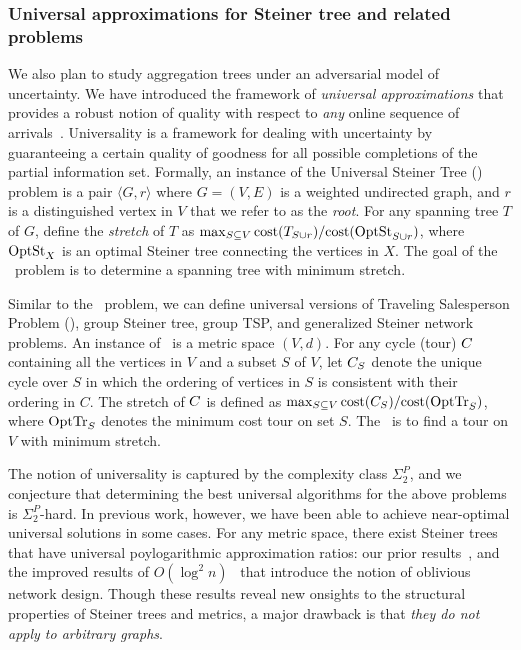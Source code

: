 \subsubsection{Universal approximations for Steiner tree and related problems}
\label{sec:ust}
We also plan to study aggregation trees under an adversarial model of
uncertainty.  We have introduced the framework of {\em universal
  approximations}\/ that provides a robust notion of quality with
respect to {\em any} online sequence of
arrivals~\cite{jia+lnrs:universal}.  Universality is a framework for
dealing with uncertainty by guaranteeing a certain quality of goodness
for all possible completions of the partial information set.
Formally, an instance of the Universal Steiner Tree (\ust) problem is
a pair $\langle G , r\rangle$ where $G = (V,E)$ is a weighted
undirected graph, and $r$ is a distinguished vertex in $V$ that we
refer to as the {\em root}.  For any spanning tree $T$ of $G$, define
the {\em stretch}\/ of $T$ as $\max_{S \subseteq V}\mbox{cost}(T_{S\cup
    r})/\mbox{cost}(\mbox{OptSt}_{S\cup r})$, where $\mbox{OptSt}_{X}$ is an optimal
Steiner tree connecting the vertices in $X$.  The goal of the
\ust\ problem is to determine a spanning tree with minimum stretch.

Similar to the \ust\ problem, we can define universal versions of
Traveling Salesperson Problem (\utsp), group Steiner tree, group TSP,
and generalized Steiner network problems.  An instance of \utsp\ is a
metric space $(V,d)$.  For any cycle (tour) $C$ containing all the
vertices in $V$ and a subset $S$ of $V$, let $C_S$ denote the unique
cycle over $S$ in which the ordering of vertices in $S$ is consistent
with their ordering in $C$.  The stretch of $C$ is defined as
$\max_{S\subseteq V} \mbox{cost}(C_{S})/\mbox{cost}(\mbox{OptTr}_{S})$, where $\mbox{OptTr}_{S}$
denotes the minimum cost tour on set $S$. The \utsp\ is to find a tour
on $V$ with minimum stretch.


The notion of universality is captured by the complexity class
$\Sigma_2^P$, and we conjecture that determining the best universal
algorithms for the above problems is $\Sigma^P_2$-hard.  In previous
work, however, we have been able to achieve near-optimal universal
solutions in some cases.  For any metric space, there exist Steiner
trees that have universal poylogarithmic approximation ratios: our
prior results~\cite{jia+lnrs:universal}, and the improved results of
$O(\log^2 n)$~\cite{gupta+hr:oblivious} that introduce the notion of
oblivious network design.  Though these results reveal new onsights to
the structural properties of Steiner trees and metrics, a major
drawback is that {\em they do not apply to arbitrary graphs}.

